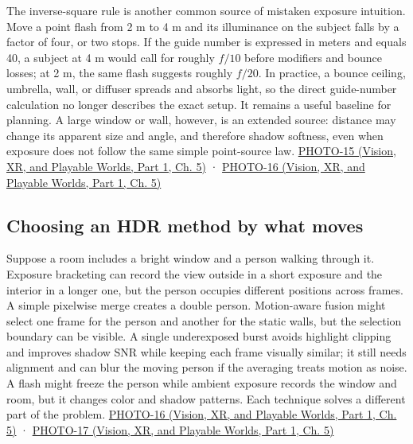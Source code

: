 The inverse-square rule is another common source of mistaken exposure intuition. Move a point flash from 2 m to 4 m and its illuminance on the subject falls by a factor of four, or two stops. If the guide number is expressed in meters and equals 40, a subject at 4 m would call for roughly \(f/10\) before modifiers and bounce losses; at 2 m, the same flash suggests roughly \(f/20\). In practice, a bounce ceiling, umbrella, wall, or diffuser spreads and absorbs light, so the direct guide-number calculation no longer describes the exact setup. It remains a useful baseline for planning. A large window or wall, however, is an extended source: distance may change its apparent size and angle, and therefore shadow softness, even when exposure does not follow the same simple point-source law. \href{../07-Vision-XR-and-Playable-Worlds-P01/main.pdf\#nameddest=04-visual-computing-ii-ch036-photo-15---photography-session-15}{PHOTO-15 (Vision, XR, and Playable Worlds, Part 1, Ch. 5)} · \href{../07-Vision-XR-and-Playable-Worlds-P01/main.pdf\#nameddest=04-visual-computing-ii-ch036-photo-16---photography-session-16}{PHOTO-16 (Vision, XR, and Playable Worlds, Part 1, Ch. 5)}

\subsection{Choosing an HDR method by what moves}\label{03-visual-computing-i-ch003-choosing-an-hdr-method-by-what-moves}

\hypertarget{03-visual-computing-i-ch003-choosing-an-hdr-method-by-what-moves}{}

Suppose a room includes a bright window and a person walking through it. Exposure bracketing can record the view outside in a short exposure and the interior in a longer one, but the person occupies different positions across frames. A simple pixelwise merge creates a double person. Motion-aware fusion might select one frame for the person and another for the static walls, but the selection boundary can be visible. A single underexposed burst avoids highlight clipping and improves shadow SNR while keeping each frame visually similar; it still needs alignment and can blur the moving person if the averaging treats motion as noise. A flash might freeze the person while ambient exposure records the window and room, but it changes color and shadow patterns. Each technique solves a different part of the problem. \href{../07-Vision-XR-and-Playable-Worlds-P01/main.pdf\#nameddest=04-visual-computing-ii-ch036-photo-16---photography-session-16}{PHOTO-16 (Vision, XR, and Playable Worlds, Part 1, Ch. 5)} · \href{../07-Vision-XR-and-Playable-Worlds-P01/main.pdf\#nameddest=04-visual-computing-ii-ch036-photo-17---photography-session-17}{PHOTO-17 (Vision, XR, and Playable Worlds, Part 1, Ch. 5)}


